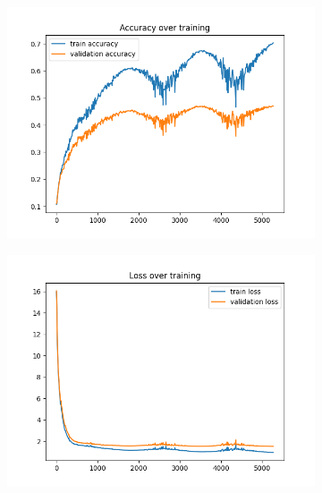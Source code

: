 \documentclass[a4paper]{article}
\begin{document}
\begin{figure}[h]
	\centering
	\begin{subfigure}{0.3\textwidth}
		\centering
		\includegraphics[width=\linewidth]{images/model_of_ex4_dropout__acc.png}
		\caption{}
	\end{subfigure}
	\begin{subfigure}{0.3\textwidth}
		\centering
		\includegraphics[width=\linewidth]{images/model_of_ex4_dropout__loss.png}
		\caption{}
	\end{subfigure}
	\begin{subfigure}{0.3\textwidth}
		\centering

\end{subfigure}
\end{figure}
\end{document}
